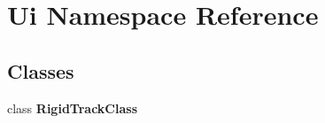 \section{Ui Namespace Reference}
\label{namespace_ui}
\subsection*{Classes}
\begin{DoxyCompactItemize}
\item 
class \textbf{ Rigid\+Track\+Class}
\end{DoxyCompactItemize}
